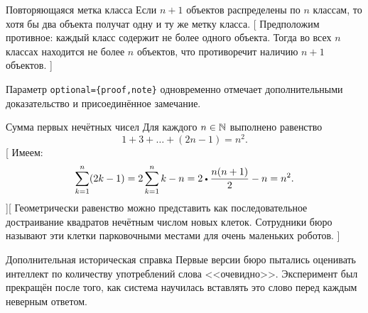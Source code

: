 {Повторяющаяся метка класса}{
    Если $n + 1$ объектов распределены по $n$ классам, то хотя бы два объекта получат одну и ту же метку класса.
}[
    Предположим противное: каждый класс содержит не более одного объекта.
    Тогда во всех $n$ классах находится не более $n$ объектов, что противоречит наличию $n + 1$ объектов.
]

Параметр \verb|optional={proof,note}| одновременно отмечает дополнительными доказательство и присоединённое замечание.

{Сумма первых нечётных чисел}{
    Для каждого $n \in \mathbb{N}$ выполнено равенство
    \begin{equation*}
        1 + 3 + \ldots + (2n - 1) = n^2.
    \end{equation*}
}[
    Имеем:
    \begin{equation*}
        \sum_{k = 1}^{n} (2k - 1)
        =
        2 \sum_{k = 1}^{n} k - n
        =
        2 \mul \frac{n(n + 1)}{2} - n
        =
        n^2.
    \end{equation*}
][
    Геометрически равенство можно представить как последовательное достраивание квадратов нечётным числом новых клеток.
    Сотрудники бюро называют эти клетки парковочными местами для очень маленьких роботов.
]

\note*[optional]{}
{Дополнительная историческая справка}{
    Первые версии бюро пытались оценивать интеллект по количеству употреблений слова <<очевидно>>.
    Эксперимент был прекращён после того, как система научилась вставлять это слово перед каждым неверным ответом.
}